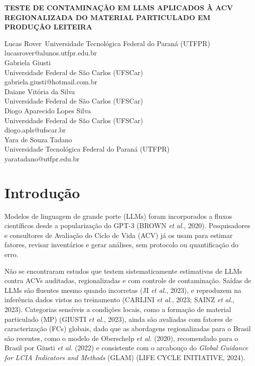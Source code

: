 \documentclass[12pt,a4paper]{article}
\begin{document}
\begin{center}
{\bfseries\uppercase{Teste de contaminação em LLMs aplicados à ACV regionalizada do material particulado em produção leiteira}}
\end{center}

\vspace{1\baselineskip}

\begin{flushright}
Lucas Rover\
Universidade Tecnológica Federal do Paraná (UTFPR)\\ lucasrover@alunos.utfpr.edu.br\\[2pt]
Gabriela Giusti\\
Universidade Federal de São Carlos (UFSCar)\\ gabriela.giusti@hotmail.com.br\\[2pt]
Daiane Vitória da Silva\\
Universidade Federal de São Carlos (UFSCar)\\[2pt]
Diogo Aparecido Lopes Silva\\
Universidade Federal de São Carlos (UFSCar)\\ diogo.apls@ufscar.br\\[2pt]
Yara de Souza Tadano\\
Universidade Tecnológica Federal do Paraná (UTFPR)\\
yaratadano@utfpr.edu.br
\end{flushright}

\vspace{1\baselineskip}

\section{Introdução}

Modelos de linguagem de grande porte (LLMs) foram incorporados a fluxos científicos desde a popularização do GPT-3 (BROWN \emph{et al.}, 2020). Pesquisadores e consultores de Avaliação do Ciclo de Vida (ACV) já os usam para estimar fatores, revisar inventários e gerar análises, sem protocolo ou quantificação do erro.

Não se encontraram estudos que testem sistematicamente estimativas de LLMs contra ACVs auditadas, regionalizadas e com controle de contaminação. Saídas de LLMs são fluentes mesmo quando incorretas (JI \emph{et al.}, 2023), e reproduzem na inferência dados vistos no treinamento (CARLINI \emph{et al.}, 2023; SAINZ \emph{et al.}, 2023). Categorias sensíveis a condições locais, como a formação de material particulado (MP) (GIUSTI \emph{et al.}, 2023), ainda são avaliadas com fatores de caracterização (FCs) globais, dado que as abordagens regionalizadas para o Brasil são recentes, como o modelo de Oberschelp \emph{et al.} (2020), recomendado para o Brasil por Giusti \emph{et al.} (2022) e consistente com o arcabouço do \emph{Global Guidance for LCIA Indicators and Methods} (GLAM) (LIFE CYCLE INITIATIVE, 2024).
\end{document}
